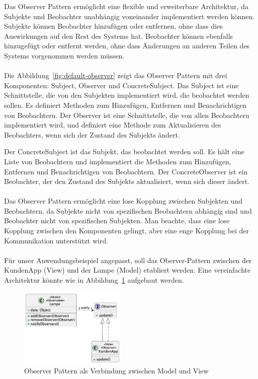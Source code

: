 Das Observer Pattern ermöglicht eine flexible und erweiterbare Architektur, da Subjekte und Beobachter unabhängig voneinander implementiert werden können. Subjekte können Beobachter hinzufügen oder entfernen, ohne dass dies Auswirkungen auf den Rest des Systems hat. Beobachter können ebenfalls hinzugefügt oder entfernt werden, ohne dass Änderungen an anderen Teilen des Systems vorgenommen werden müssen.
\\\\
Die Abbildung~\ref{fig:default-observer} zeigt das Observer Pattern mit drei Komponenten: Subject, Observer und ConcreteSubject. Das Subject ist eine Schnittstelle, die von den Subjekten implementiert wird, die beobachtet werden sollen. Es definiert Methoden zum Hinzufügen, Entfernen und Benachrichtigen von Beobachtern. Der Observer ist eine Schnittstelle, die von allen Beobachtern implementiert wird, und definiert eine Methode zum Aktualisieren des Beobachters, wenn sich der Zustand des Subjekts ändert.

Der ConcreteSubject ist das Subjekt, das beobachtet werden soll. Es hält eine Liste von Beobachtern und implementiert die Methoden zum Hinzufügen, Entfernen und Benachrichtigen von Beobachtern. Der ConcreteObserver ist ein Beobachter, der den Zustand des Subjekts aktualisiert, wenn sich dieser ändert.
\\\\
Das Observer Pattern ermöglicht eine lose Kopplung zwischen Subjekten und Beobachtern, da Subjekte nicht von spezifischen Beobachtern abhängig sind und Beobachter nicht von spezifischen Subjekten. Man beachte, dass eine lose Kopplung zwischen den Komponenten gelingt, aber eine enge Kopplung bei der Kommunikation unterstützt wird. 
\\\\
Für unser Anwendungsbeispiel angepasst, soll das Oberver-Pattern zwischen der KundenApp (View) und der Lampe (Model) etabliert werden. Eine vereinfachte Architektur könnte wie in Abbildung~\ref{fig:mvc-observer} aufgebaut werden. 

\begin{figure}[ht]
  \centering
  \includegraphics[width=0.45\textwidth]{fig/uml/mvc-observer.png}
  \caption{Observer Pattern als Verbindung zwischen Model und View}
  \label{fig:mvc-observer}
\end{figure}

